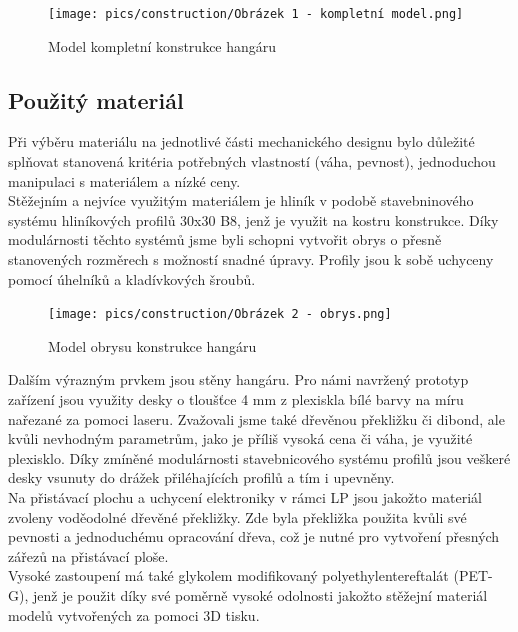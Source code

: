 \documentclass[a4paper]{article}
\begin{document}
    \begin{figure}
        \centering
        \texttt{[image: pics/construction/Obrázek 1 - kompletní model.png]}
        \caption{Model kompletní konstrukce hangáru}
        \label{fig:const_1}
    \end{figure}
    
    \subsection{Použitý materiál} \label{31-pouux17eituxfd-materiuxe1l}
    
    Při výběru materiálu na jednotlivé části mechanického designu bylo důležité splňovat stanovená kritéria potřebných vlastností (váha, pevnost), jednoduchou manipulaci s materiálem a nízké ceny.\\

    \noindent
    Stěžejním a nejvíce využitým materiálem je hliník v podobě stavebninového systému hliníkových profilů 30x30 B8, jenž je využit na kostru konstrukce. Díky modulárnosti těchto systémů jsme byli schopni vytvořit obrys o přesně stanovených rozměrech s možností snadné úpravy. Profily jsou k sobě uchyceny pomocí úhelníků a kladívkových šroubů.\\

    \begin{figure}
        \centering
        \texttt{[image: pics/construction/Obrázek 2 - obrys.png]}
        \caption{Model obrysu konstrukce hangáru}
        \label{fig:const_2}
    \end{figure}

    \noindent
    Dalším výrazným prvkem jsou stěny hangáru. Pro námi navržený prototyp zařízení jsou využity desky o tloušťce 4 mm z plexiskla bílé barvy na míru nařezané za pomoci laseru. Zvažovali jsme také dřevěnou překližku či dibond, ale kvůli nevhodným parametrům, jako je příliš vysoká cena či váha, je využité plexisklo. Díky zmíněné modulárnosti stavebnicového systému profilů jsou veškeré desky vsunuty do drážek přiléhajících profilů a tím i upevněny.\\

    \noindent   
    Na přistávací plochu a uchycení elektroniky v rámci \acs{LP} jsou jakožto materiál zvoleny voděodolné dřevěné překližky. Zde byla překližka použita kvůli své pevnosti a jednoduchému opracování dřeva, což je nutné pro vytvoření přesných zářezů na přistávací ploše.\\

    \noindent   
    Vysoké zastoupení má také glykolem modifikovaný polyethylentereftalát (PET-G), jenž je použit díky své poměrně vysoké odolnosti jakožto stěžejní materiál modelů vytvořených za pomoci 3D tisku.\\
\end{document}

